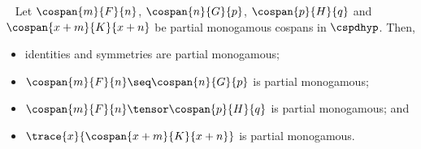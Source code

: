 \begin{theorem}~\label{thm:partial-monogamous-ops}
    Let \(\cospan{m}{F}{n}\), \(\cospan{n}{G}{p}\), \(\cospan{p}{H}{q}\) and
    \(\cospan{x+m}{K}{x+n}\) be partial monogamous cospans in \(\cspdhyp\).
    Then,
    \begin{itemize}
        \item identities and symmetries are partial monogamous;
        \item \(\cospan{m}{F}{n} \seq \cospan{n}{G}{p}\) is partial monogamous;
        \item \(\cospan{m}{F}{n} \tensor \cospan{p}{H}{q}\) is partial
                monogamous; and
        \item \(\trace{x}{\cospan{x+m}{K}{x+n}} \) is partial monogamous.
    \end{itemize}
\end{theorem}
